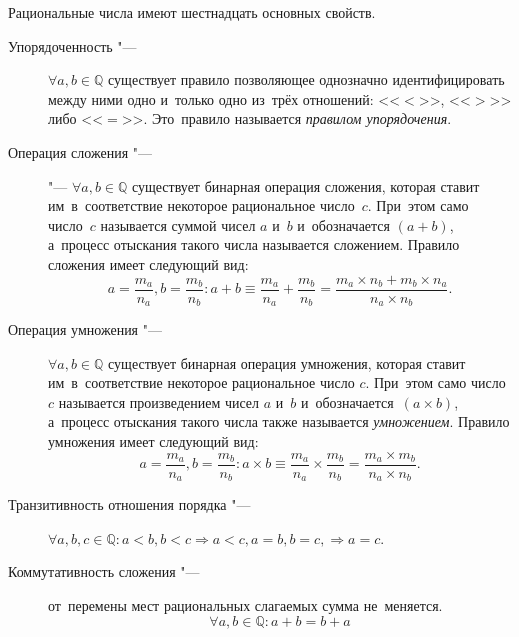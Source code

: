 \documentclass[]{scrartcl}
\begin{document}
\begin{description}
	Рациональные числа имеют шестнадцать основных свойств.
	\begin{description}
		\item[Упорядоченность "---] ${\textstyle \forall a,b \in \mathbb{Q}}$ существует правило позволяющее однозначно идентифицировать между ними одно и~только одно из~трёх отношений: <<${\textstyle <}$>>, <<${\textstyle >}$>> либо <<${\textstyle =}$>>. Это~правило называется \emph{правилом упорядочения}.
		\item[Операция сложения "---] "--- ${\textstyle \forall a,b \in \mathbb{Q}}$ существует бинарная операция сложения, которая ставит им~в~соответствие некоторое рациональное число~${\textstyle c}$.  При~этом само число~${\textstyle c}$ называется суммой чисел ${\textstyle a}$ и~${\textstyle b}$ и~обозначается ${\textstyle \left(a+b\right)}$, а~процесс отыскания такого числа называется сложением. Правило сложения имеет следующий вид:
		\begin{equation}\label{eq:rational-numbers-sum}
		a=\frac{m_{a}}{n_{a}}, 	b=\frac{m_{b}}{n_{b}}:a+b \equiv \frac{m_{a}}{n_{a}} + \frac{m_{b}}{n_{b}} = \frac{m_{a} \times n_{b} + m_{b} \times n_{a}}{n_{a}\times n_{b}}. 
		\end{equation}
		\item[Операция умножения "---] ${\textstyle \forall a,b \in \mathbb{Q}}$ существует бинарная операция умножения, которая ставит им~в~соответствие некоторое рациональное число ${\textstyle c}$. При~этом само число ${\textstyle c}$ называется произведением чисел ${\textstyle a}$ и~${\textstyle b}$ и~обозначается~${\textstyle \left(a\times b\right)}$, а~процесс отыскания такого числа также называется \emph{умножением}.
		Правило умножения имеет следующий вид:
		\begin{equation}\label{eq:rational-numbers-multiplication}
		a=\frac{m_{a}}{n_{a}}, b=\frac{m_{b}}{n_{b}}: a \times b \equiv \frac{m_{a}}{n_{a}} \times \frac{m_{b}}{n_{b}} = \frac{m_{a} \times m_{b}}{n_{a} \times n_{b}}.
		\end{equation}
		\item[Транзитивность отношения порядка "---] ${\textstyle \forall a,b,c \in \mathbb{Q}: a<b, b<c \Rightarrow a<c, a=b, b=c, \Rightarrow a=c}$.
		\item[Коммутативность сложения "---] от~перемены мест рациональных слагаемых сумма не~меняется.
		\begin{equation}\label{eq:rational-numbers-addition-commutativity}
		\forall a,b \in \mathbb{Q}: a+b=b+a
		\end{equation}

\end{description}
\end{description}
\end{document}
